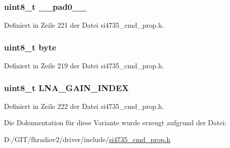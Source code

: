 \subsubsection[{\+\_\+\+\_\+pad0\+\_\+\+\_\+}]{\setlength{\rightskip}{0pt plus 5cm}uint8\+\_\+t \+\_\+\+\_\+pad0\+\_\+\+\_\+}\label{unionfm__agc__override__arg2_a8b4eebe79ded0459acec2f4950102ba3}


Definiert in Zeile 221 der Datei si4735\+\_\+cmd\+\_\+prop.\+h.

\hypertarget{unionfm__agc__override__arg2_a96f44d20f1dbf1c8785a7bc99a46164c}{}
\subsubsection[{byte}]{\setlength{\rightskip}{0pt plus 5cm}uint8\+\_\+t byte}\label{unionfm__agc__override__arg2_a96f44d20f1dbf1c8785a7bc99a46164c}


Definiert in Zeile 219 der Datei si4735\+\_\+cmd\+\_\+prop.\+h.

\hypertarget{unionfm__agc__override__arg2_a0a84cd6abd9c04a7912cb54a2a3949df}{}
\subsubsection[{L\+N\+A\+\_\+\+G\+A\+I\+N\+\_\+\+I\+N\+D\+E\+X}]{\setlength{\rightskip}{0pt plus 5cm}uint8\+\_\+t L\+N\+A\+\_\+\+G\+A\+I\+N\+\_\+\+I\+N\+D\+E\+X}\label{unionfm__agc__override__arg2_a0a84cd6abd9c04a7912cb54a2a3949df}


Definiert in Zeile 222 der Datei si4735\+\_\+cmd\+\_\+prop.\+h.



Die Dokumentation für diese Variante wurde erzeugt aufgrund der Datei\+:\begin{DoxyCompactItemize}
\item 
D\+:/\+G\+I\+T/fhradiov2/driver/include/\hyperlink{si4735__cmd__prop_8h}{si4735\+\_\+cmd\+\_\+prop.\+h}\end{DoxyCompactItemize}
